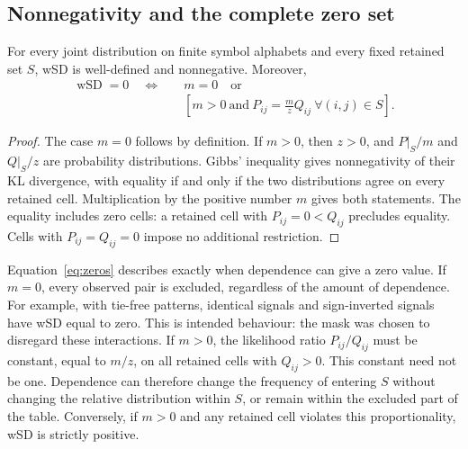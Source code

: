\subsection{Nonnegativity and the complete zero set}
\begin{theorem}
For every joint distribution on finite symbol alphabets and every fixed retained set $S$, wSD is well-defined and nonnegative. Moreover,
\begin{align}
\operatorname{wSD}=0\quad\Longleftrightarrow\quad &m=0\quad\text{or}\nonumber\\
&\left[m>0\ \text{and}\ P_{ij}=\frac{m}{z}Q_{ij}
\ \forall(i,j)\in S\right].
\label{eq:zeros}
\end{align}
\end{theorem}
\begin{proof}
The case $m=0$ follows by definition. If $m>0$, then $z>0$, and $P|_S/m$ and $Q|_S/z$ are probability distributions. Gibbs' inequality gives nonnegativity of their KL divergence, with equality if and only if the two distributions agree on every retained cell. Multiplication by the positive number $m$ gives both statements. The equality includes zero cells: a retained cell with $P_{ij}=0<Q_{ij}$ precludes equality. Cells with $P_{ij}=Q_{ij}=0$ impose no additional restriction.
\end{proof}

Equation~\eqref{eq:zeros} describes exactly when dependence can give a zero value. If $m=0$, every observed pair is excluded, regardless of the amount of dependence. For example, with tie-free patterns, identical signals and sign-inverted signals have wSD equal to zero. This is intended behaviour: the mask was chosen to disregard these interactions. If $m>0$, the likelihood ratio $P_{ij}/Q_{ij}$ must be constant, equal to $m/z$, on all retained cells with $Q_{ij}>0$. This constant need not be one. Dependence can therefore change the frequency of entering $S$ without changing the relative distribution within $S$, or remain within the excluded part of the table. Conversely, if $m>0$ and any retained cell violates this proportionality, wSD is strictly positive.

